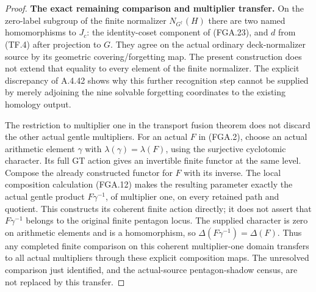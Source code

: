 \begin{proof}
\par\medskip\noindent\textbf{The exact remaining comparison and multiplier transfer.}\quad
On the zero-label subgroup of the finite normalizer
$N_{G^\dagger}(H)$ there are two named homomorphisms
to $J_c$: the identity-coset component of (FGA.23),
and $d$ from (TF.4) after projection to $G$.
They agree on the actual ordinary deck-normalizer
source by its geometric covering/forgetting map.
The present construction does not extend that
equality to every element of the finite normalizer.
The explicit discrepancy of A.4.42 shows why
this further recognition step cannot be supplied
by merely adjoining the nine solvable forgetting
coordinates to the existing homology output.

The restriction to multiplier one in the transport
fusion theorem does not discard the other actual
gentle multipliers.  For an actual $F$ in (FGA.2),
choose an actual arithmetic element $\gamma$ with
$\lambda(\gamma)=\lambda(F)$, using the surjective
cyclotomic character.  Its full GT action gives
an invertible finite functor at the same level.
Compose the already constructed functor for $F$
with its inverse.  The local composition calculation
(FGA.12) makes the resulting parameter exactly the
actual gentle product $F\gamma^{-1}$, of multiplier
one, on every retained path and quotient.
This constructs its coherent finite action directly;
it does not assert that $F\gamma^{-1}$ belongs to
the original finite pentagon locus.
The supplied character is zero on arithmetic
elements and is a homomorphism, so
$\Delta(F\gamma^{-1})=\Delta(F)$.
Thus any completed finite comparison on this
coherent multiplier-one domain transfers to all
actual multipliers through these explicit
composition maps.  The unresolved comparison just
identified, and the actual-source pentagon-shadow
census, are not replaced by this transfer.
\end{proof}
